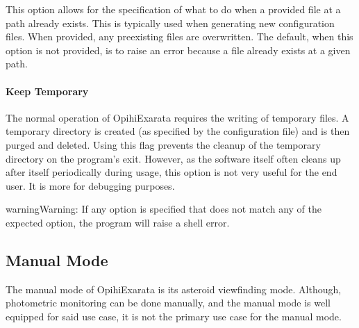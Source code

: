 \documentclass[letterpaper,11pt,english]{sphinxmanual}
\begin{document}
\sphinxAtStartPar
This option allows for the specification of what to do when a provided
file at a path already exists. This is typically used when generating new
configuration files. When provided, any pre\sphinxhyphen{}existing files are overwritten.
The default, when this option is not provided, is to raise an error because a
file already exists at a given path.


\paragraph{Keep Temporary}
\label{\detokenize{user/command_line:keep-temporary}}

\begin{savenotes}\begin{fulllineitems}
\label{\detokenize{user/command_line:cmdoption-keep-temporary}}
\pysigstartsignatures
{}
\pysigstopsignatures
\end{fulllineitems}\end{savenotes}


\sphinxAtStartPar
The normal operation of OpihiExarata requires the writing of temporary files.
A temporary directory is created (as specified by the configuration file) and
is then purged and deleted. Using this flag prevents the cleanup of the
temporary directory on the program’s exit. However, as the software itself
often cleans up after itself periodically during usage, this option is not
very useful for the end user. It is more for debugging purposes.

\begin{sphinxadmonition}{warning}{Warning:}
\sphinxAtStartPar
If any option is specified that does not match any of the expected option,
the program will raise a shell error.
\end{sphinxadmonition}

\sphinxstepscope


\subsection{Manual Mode}
\label{\detokenize{user/manual_mode:manual-mode}}\label{\detokenize{user/manual_mode:user-manual-mode}}\label{\detokenize{user/manual_mode::doc}}
\sphinxAtStartPar
The manual mode of OpihiExarata is its asteroid view\sphinxhyphen{}finding mode. Although,
photometric monitoring can be done manually, and the manual mode is well
equipped for said use case, it is not the primary use case for the manual mode.
\end{document}
